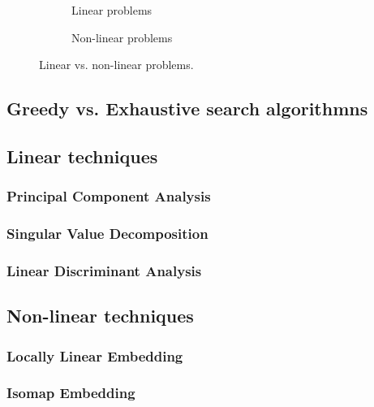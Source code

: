 \begin{figure}[h]
	\begin{subfigure}{0.4\textwidth}
	    \caption{Linear problems}
		
	    \label{subfig:linearproblems}
	\end{subfigure}
	\hfill
	\begin{subfigure}{0.4\textwidth}
	    \caption{Non-linear problems}
		
	    \label{subfig:nonlinearproblems}
	\end{subfigure}
\caption{Linear vs. non-linear problems.}
\label{fig:linearvsnonlinearproblems}
\end{figure}


\subsection{Greedy vs. Exhaustive search algorithmns}

\subsection{Linear techniques}

\subsubsection{Principal Component Analysis}
\subsubsection{Singular Value Decomposition}
\subsubsection{Linear Discriminant Analysis}

\subsection{Non-linear techniques}

\subsubsection{Locally Linear Embedding}
\subsubsection{Isomap Embedding}
